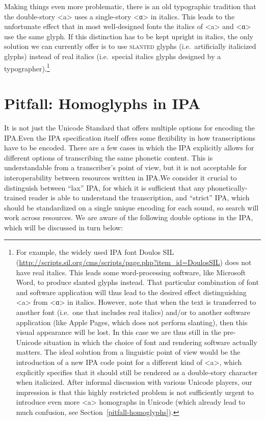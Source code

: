 Making things even more problematic, there is an old typographic tradition that
the double-story <a> uses a single-story <ɑ> in italics. This leads to the
unfortunate effect that in most well-designed fonts the italics of <a> and <ɑ>
use the same glyph. If this distinction has to be kept upright in italics, the
only solution we can currently offer is to use \textsc{slanted} glyphs
(i.e.~artificially italicized glyphs) instead of real italics (i.e.~special
italics glyphs designed by a typographer).\footnote{For example, the widely used
IPA font Doulos SIL
(\url{http://scripts.sil.org/cms/scripts/page.php?item\_id=DoulosSIL}) does not
have real italics. This leads some word-processing software, like Microsoft
Word, to produce slanted glyphs instead. That particular combination of font and
software application will thus lead to the desired effect distinguishing <a>
from <ɑ> in italics. However, note that when the text is transferred to another
font (i.e.~one that includes real italics) and/or to another software
application (like Apple Pages, which does not perform slanting), then this
visual appearance will be lost. In this case we are thus still in the
pre-Unicode situation in which the choice of font and rendering software
actually matters. The ideal solution from a linguistic point of view would be
the introduction of a new IPA code point for a different kind of <a>, which
explicitly specifies that it should still be rendered as a double-story
character when italicized. After informal discussion with various Unicode
players, our impression is that this highly restricted problem is not
sufficiently urgent to introduce even more <a> homographs in Unicode (which
already lead to much confusion, see Section~\ref{pitfall-homoglyphs}).}

      

\section{Pitfall: Homoglyphs in IPA}
\label{pitfall-homoglyphs-in-IPA}

It is not just the Unicode Standard that offers multiple options for encoding
the IPA.\@ Even the IPA specification itself offers some flexibility in how
transcriptions have to be encoded. There are a few cases in which the IPA
explicitly allows for different options of transcribing the same phonetic
content. This is understandable from a transcriber's point of view, but it is
not acceptable for interoperability between resources written in IPA.\@ We
consider it crucial to distinguish between ``lax'' IPA, for which it is
sufficient that any phonetically-trained reader is able to understand the
transcription, and ``strict'' IPA, which should be standardized on a single
unique encoding for each sound, so search will work across resources. We are 
aware of the following double options in the IPA, which will be discussed in 
turn below:

